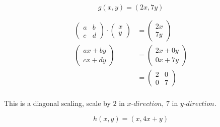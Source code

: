 \documentclass{tufte-handout}
\begin{document}
 


\begin{question}

\qpart
\qsubpart

\[ g(x,y) = (2x,7y) \]

\begin{align*}
    \begin{pmatrix}
        a & b \\
        c & d
    \end{pmatrix}
    \cdot
    \begin{pmatrix}
        x \\
        y
    \end{pmatrix}
    &=
    \begin{pmatrix}
        2x\\
        7y
    \end{pmatrix}\\[8pt]
    \begin{pmatrix}
        ax + by \\
        cx + dy
    \end{pmatrix}
    &=
    \begin{pmatrix}
        2x + 0y\\
        0x + 7y
    \end{pmatrix}\\[8pt]
    &=
    \begin{pmatrix}
        2 & 0 \\
        0 & 7
    \end{pmatrix}\\
\end{align*}

This is a diagonal scaling, scale by \( 2 \) in \( x‐direction \), \( 7 \) in \( y‐direction \).

\vspace{3cm}
\qsubpart

\[ h(x,y) = (x,4x+y) \]


\end{question}
\end{document}
